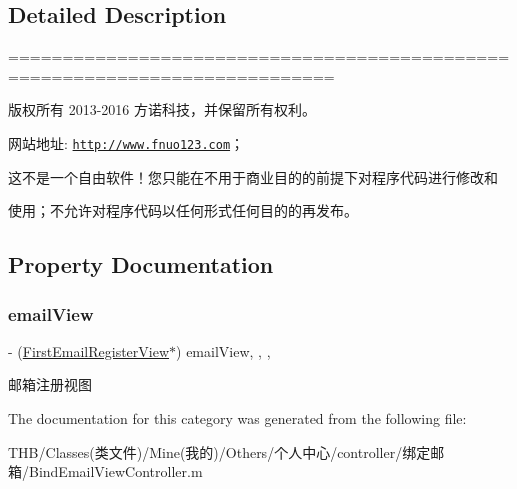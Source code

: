 \subsection{Detailed Description}
============================================================================

版权所有 2013-\/2016 方诺科技，并保留所有权利。

网站地址\+: \href{http://www.fnuo123.com}{\tt http\+://www.\+fnuo123.\+com}； 



这不是一个自由软件！您只能在不用于商业目的的前提下对程序代码进行修改和

使用；不允许对程序代码以任何形式任何目的的再发布。 

 

\subsection{Property Documentation}
\mbox{\label{category_bind_email_view_controller_07_08_a96d91f4d195d637b2360fcc82e7333bc}} 
\subsubsection{\texorpdfstring{email\+View}{emailView}}
{\footnotesize\ttfamily -\/ (\mbox{\hyperlink{interface_first_email_register_view}{First\+Email\+Register\+View}}$\ast$) email\+View\hspace{0.3cm}{\ttfamily [read]}, {\ttfamily [write]}, {\ttfamily [nonatomic]}, {\ttfamily [strong]}}

邮箱注册视图 

The documentation for this category was generated from the following file\+:\begin{DoxyCompactItemize}
\item 
T\+H\+B/\+Classes(类文件)/\+Mine(我的)/\+Others/个人中心/controller/绑定邮箱/Bind\+Email\+View\+Controller.\+m\end{DoxyCompactItemize}
